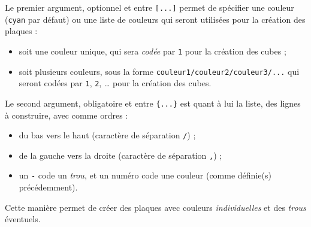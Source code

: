 \documentclass[french,a4paper,11pt]{article}
\begin{document}
\begin{tipblock}
Le premier argument, optionnel et entre \texttt{[...]} permet de spécifier une couleur (\texttt{cyan} par défaut) ou une liste de couleurs qui seront utilisées pour la création des plaques :

\begin{itemize}
	\item soit une couleur unique, qui sera \textit{codée} par \texttt{1} pour la création des cubes ;
	\item soit plusieurs couleurs, sous la forme \texttt{couleur1/couleur2/couleur3/...} qui seront codées par \texttt{1}, \texttt{2}, \ldots{} pour la création des cubes.
\end{itemize}

Le second argument, obligatoire et entre \texttt{\{...\}} est quant à lui la liste, des lignes à construire, avec comme ordres :

\begin{itemize}
	\item du bas vers le haut (caractère de séparation \texttt{/}) ;
	\item de la gauche vers la droite (caractère de séparation \texttt{,}) ;
	\item un \texttt{-} code un \textit{trou}, et un numéro code une couleur (comme définie(s) précédemment).
\end{itemize}

Cette manière permet de créer des plaques avec couleurs \textit{individuelles} et des \textit{trous} éventuels.
\end{tipblock}

\begin{PresCode}{}
\begin{EmpilementCubes}
\end{EmpilementCubes}
\end{PresCode}

\begin{PresCode}{}
\begin{EmpilementCubes}
	\PlaqueVide[2]
	\PlaqueVide[2]
\end{EmpilementCubes}
\end{PresCode}

\begin{PresCode}{}
\begin{EmpilementCubes}
\end{EmpilementCubes}
\end{PresCode}
\end{document}

